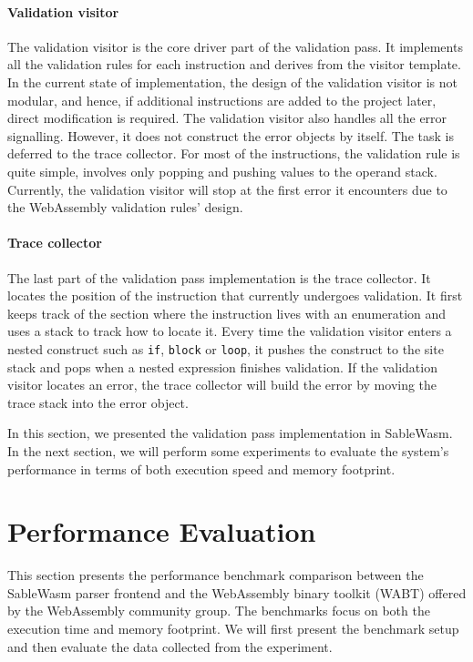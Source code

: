 \paragraph{Validation visitor}
The validation visitor is the core driver part of the validation pass. It
implements all the validation rules for each instruction and derives from the
visitor template. In the current state of implementation, the design of the
validation visitor is not modular, and hence, if additional instructions are
added to the project later, direct modification is required. The validation
visitor also handles all the error signalling. However, it does not construct
the error objects by itself. The task is deferred to the trace collector. For
most of the instructions, the validation rule is quite simple, involves only
popping and pushing values to the operand stack. Currently, the validation
visitor will stop at the first error it encounters due to the WebAssembly
validation rules' design.

\paragraph{Trace collector}
The last part of the validation pass implementation is the trace collector. It
locates the position of the instruction that currently undergoes validation. It
first keeps track of the section where the instruction lives with an enumeration
and uses a stack to track how to locate it. Every time the validation visitor
enters a nested construct such as \texttt{if}, \texttt{block} or \texttt{loop},
it pushes the construct to the site stack and pops when a nested expression
finishes validation. If the validation visitor locates an error, the trace
collector will build the error by moving the trace stack into the error object.

In this section, we presented the validation pass implementation in SableWasm.
In the next section, we will perform some experiments to evaluate the system's
performance in terms of both execution speed and memory footprint.

\section{Performance Evaluation}

This section presents the performance benchmark comparison between the SableWasm
parser frontend and the WebAssembly binary toolkit (WABT) offered by the
WebAssembly community group. The benchmarks focus on both the execution time and
memory footprint. We will first present the benchmark setup and then evaluate
the data collected from the experiment.


